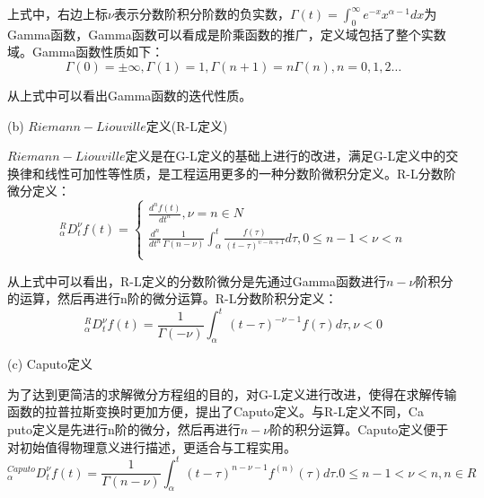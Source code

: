 上式中，右边上标$\nu$表示分数阶积分阶数的负实数，$\Gamma \left( t \right)=\int_{0}^{\infty }{{{e}^{-x}}{{x}^{\alpha -1}}dx}$为\\Gamma函数，Gamma函数可以看成是阶乘函数的推广，定义域包括了整个实数域。Gamma函数性质如下：
\begin{equation}
\Gamma \left( 0 \right)=\pm \infty ,\Gamma \left( 1 \right)=1,\Gamma \left( n+1 \right)=n\Gamma \left( n \right),n=0,1,2\ldots 
\end{equation}

从上式中可以看出Gamma函数的迭代性质。

(b) $Riemann-Liouville$定义(R-L定义)

$Riemann-Liouville$定义是在G-L定义的基础上进行的改进，满足G-L定义中的交换律和线性可加性等性质，是工程运用更多的一种分数阶微积分定义。R-L分数阶微分定义：
\begin{equation}
{}_{\alpha }^{R}D_{t}^{\nu }f(t)=\left\{ \begin{matrix}
   \frac{{{d}^{n}}f\left( t \right)}{d{{t}^{n}}},\nu =n\in N  \\
   \frac{{{d}^{n}}}{d{{t}^{n}}}\frac{1}{\Gamma \left( n-\nu  \right)}\int_{\alpha }^{t}{\frac{f\left( \tau  \right)}{{{\left( t-\tau  \right)}^{\upsilon -n+1}}}d\tau ,0\le n-1<\nu <n}  \\
\end{matrix} \right.
\end{equation}

从上式中可以看出，R-L定义的分数阶微分是先通过Gamma函数进行$n-\nu $阶积分的运算，然后再进行n阶的微分运算。R-L分数阶积分定义：
\begin{equation}
{}_{\alpha }^{R}D_{t}^{\nu }f(t)=\frac{1}{\Gamma \left( -\nu  \right)}\int_{\alpha }^{t}{{{\left( t-\tau  \right)}^{-\nu -1}}f\left( \tau  \right)}d\tau ,\nu <0
\end{equation}

(c)	Caputo定义

为了达到更简洁的求解微分方程组的目的，对G-L定义进行改进，使得在求解传输函数的拉普拉斯变换时更加方便，提出了Caputo定义。与R-L定义不同，Ca\\puto定义是先进行n阶的微分，然后再进行$n-\nu $阶的积分运算。Caputo定义便于对初始值得物理意义进行描述，更适合与工程实用。
\begin{equation}
{}_{\alpha }^{Caputo}D_{t}^{\nu }f(t)=\frac{1}{\Gamma \left( n-\nu  \right)}\int_{\alpha }^{t}{{{\left( t-\tau  \right)}^{n-\nu -1}}{{f}^{\left( n \right)}}\left( \tau  \right)}d\tau .0\le n-1<\nu <n,n\in R
\end{equation}

